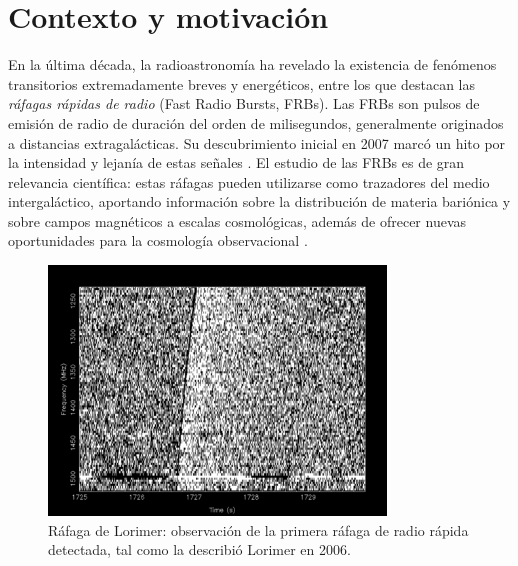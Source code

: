 
\section{Contexto y motivación}
En la última década, la radioastronomía ha revelado la existencia de fenómenos transitorios extremadamente breves y energéticos, entre los que destacan las \textit{ráfagas rápidas de radio} (Fast Radio Bursts, FRBs). Las FRBs son pulsos de emisión de radio de duración del orden de milisegundos, generalmente originados a distancias extragalácticas. Su descubrimiento inicial en 2007 marcó un hito por la intensidad y lejanía de estas señales \cite{Lorimer_2007}. El estudio de las FRBs es de gran relevancia científica: estas ráfagas pueden utilizarse como trazadores del medio intergaláctico, aportando información sobre la distribución de materia bariónica y sobre campos magnéticos a escalas cosmológicas, además de ofrecer nuevas oportunidades para la cosmología observacional \cite{Petroff_2022}. 

\begin{figure}[h]
\centering
\includegraphics[width=0.8\textwidth]{figures/Lorimer Burst.png}
\caption{Ráfaga de Lorimer: observación de la primera ráfaga de radio rápida detectada, tal como la describió Lorimer en 2006.}
\label{fig:lorimer}
\end{figure}

